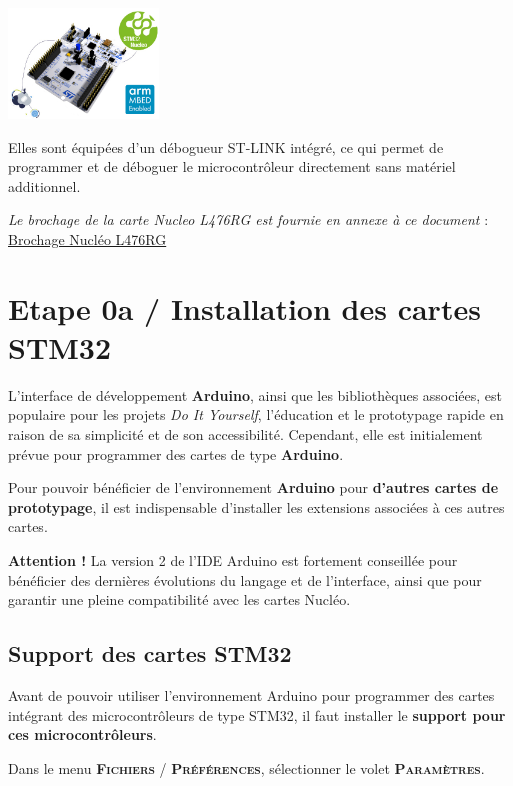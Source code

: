 \documentclass[a4paper,11pt,titlepage]{article} %
\begin{document}
\begin{center}
	\includegraphics[width=0.3\textwidth]{images/nucleo_board.jpg}
\end{center}

Elles sont équipées d'un débogueur ST-LINK intégré, ce qui permet de programmer et de déboguer le microcontrôleur directement sans matériel additionnel.

\textsl{Le brochage de la carte Nucleo L476RG est fournie en annexe à ce document} : \hyperref[doc:nucleo_pins_476RG]{Brochage Nucléo L476RG}


\section{Etape 0a / Installation des cartes STM32}

L'interface de développement \textbf{Arduino}, ainsi que les bibliothèques associées, est populaire pour les projets \textit{Do It Yourself}, l'éducation et le prototypage rapide en raison de sa simplicité et de son accessibilité. Cependant, elle est initialement prévue pour programmer des cartes de type \textbf{Arduino}.

Pour pouvoir bénéficier de l'environnement \textbf{Arduino} pour \textbf{d'autres cartes de prototypage}, il est indispensable d'installer les extensions associées à ces autres cartes.

\textbf{Attention !} La version 2 de l'IDE Arduino est fortement conseillée pour bénéficier des dernières évolutions du langage et de l'interface, ainsi que pour garantir une pleine compatibilité avec les cartes Nucléo.

\subsection{Support des cartes STM32}

Avant de pouvoir utiliser l'environnement Arduino pour programmer des cartes intégrant des microcontrôleurs de type STM32, il faut installer le \textbf{support pour ces microcontrôleurs}.

Dans le menu \textsc{\textbf{Fichiers} / \textbf{Préférences}}, sélectionner le volet \textsc{\textbf{Paramètres}}.
\end{document}
